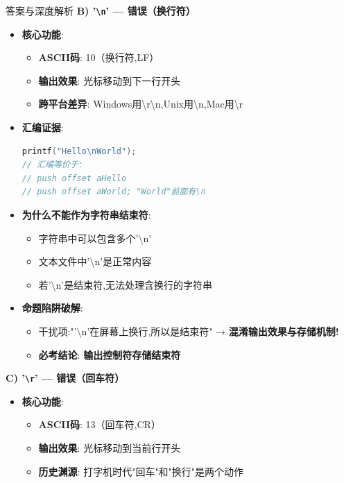\documentclass[a4paper,12pt]{article}
\begin{document}
\begin{bluebox}{答案与深度解析}
	\textbf{B) '\texttt{\textbackslash n}' — 错误（换行符）}
	\begin{itemize}[leftmargin=*, nosep]
		\item \textbf{核心功能}:
		      \begin{itemize}
			      \item \textbf{ASCII码}: 10（换行符,LF）
			      \item \textbf{输出效果}: 光标移动到下一行开头
			      \item \textbf{跨平台差异}: Windows用\textbackslash r\textbackslash n,Unix用\textbackslash n,Mac用\textbackslash r
		      \end{itemize}

		\item \textbf{汇编证据}:
		      \begin{lstlisting}[language=C]
printf("Hello\nWorld");
// 汇编等价于:
// push offset aHello
// push offset aWorld; "World"前面有\n
    \end{lstlisting}

		\item \textbf{为什么不能作为字符串结束符}:
		      \begin{itemize}
			      \item 字符串中可以包含多个'\textbackslash n'
			      \item 文本文件中'\textbackslash n'是正常内容
			      \item 若'\textbackslash n'是结束符,无法处理含换行的字符串
		      \end{itemize}

		\item \textbf{命题陷阱破解}:
		      \begin{itemize}
			      \item 干扰项:"'\textbackslash n'在屏幕上换行,所以是结束符" → \textbf{混淆输出效果与存储机制!}
			      \item \textbf{必考结论}: \textbf{输出控制符\neq 存储结束符}
		      \end{itemize}
	\end{itemize}

	\textbf{C) '\texttt{\textbackslash r}' — 错误（回车符）}
	\begin{itemize}[leftmargin=*, nosep]
		\item \textbf{核心功能}:
		      \begin{itemize}
			      \item \textbf{ASCII码}: 13（回车符,CR）
			      \item \textbf{输出效果}: 光标移动到当前行开头
			      \item \textbf{历史渊源}: 打字机时代"回车"和"换行"是两个动作
		      \end{itemize}


\end{itemize}
\end{bluebox}
\end{document}

